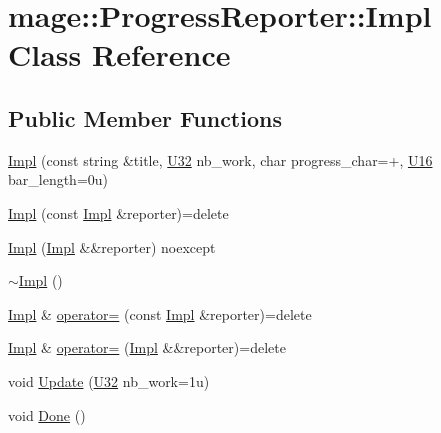 \hypertarget{classmage_1_1_progress_reporter_1_1_impl}{}\section{mage\+:\+:Progress\+Reporter\+:\+:Impl Class Reference}
\label{classmage_1_1_progress_reporter_1_1_impl}
\subsection*{Public Member Functions}
\begin{DoxyCompactItemize}
\item 
\mbox{\hyperlink{classmage_1_1_progress_reporter_1_1_impl_adbc7eea5ecbc0733967aa186b61a1582}{Impl}} (const string \&title, \mbox{\hyperlink{namespacemage_a41c104c036fba3756a74e19f793eeaa1}{U32}} nb\+\_\+work, char progress\+\_\+char=\textquotesingle{}+\textquotesingle{}, \mbox{\hyperlink{namespacemage_af69057eec1ce005c1c3b34ae33486f16}{U16}} bar\+\_\+length=0u)
\item 
\mbox{\hyperlink{classmage_1_1_progress_reporter_1_1_impl_af721b271934a492c3a47d8920d76c3c8}{Impl}} (const \mbox{\hyperlink{classmage_1_1_progress_reporter_1_1_impl}{Impl}} \&reporter)=delete
\item 
\mbox{\hyperlink{classmage_1_1_progress_reporter_1_1_impl_ab3b6811ed80a087ac10c90e97730147c}{Impl}} (\mbox{\hyperlink{classmage_1_1_progress_reporter_1_1_impl}{Impl}} \&\&reporter) noexcept
\item 
\mbox{\hyperlink{classmage_1_1_progress_reporter_1_1_impl_af5dbbaa059fdfc22e90e274ba14053a8}{$\sim$\+Impl}} ()
\item 
\mbox{\hyperlink{classmage_1_1_progress_reporter_1_1_impl}{Impl}} \& \mbox{\hyperlink{classmage_1_1_progress_reporter_1_1_impl_a18d90c9b1c400d83d8c3a1ba54b23d69}{operator=}} (const \mbox{\hyperlink{classmage_1_1_progress_reporter_1_1_impl}{Impl}} \&reporter)=delete
\item 
\mbox{\hyperlink{classmage_1_1_progress_reporter_1_1_impl}{Impl}} \& \mbox{\hyperlink{classmage_1_1_progress_reporter_1_1_impl_a39801a31c5265467a8056f2bb125cf39}{operator=}} (\mbox{\hyperlink{classmage_1_1_progress_reporter_1_1_impl}{Impl}} \&\&reporter)=delete
\item 
void \mbox{\hyperlink{classmage_1_1_progress_reporter_1_1_impl_a89d8090c7280c12a046c03df8dc7d7b3}{Update}} (\mbox{\hyperlink{namespacemage_a41c104c036fba3756a74e19f793eeaa1}{U32}} nb\+\_\+work=1u)
\item 
void \mbox{\hyperlink{classmage_1_1_progress_reporter_1_1_impl_a58a0fb3d0e5f164fc36ad7416bb98d2d}{Done}} ()
\end{DoxyCompactItemize}
